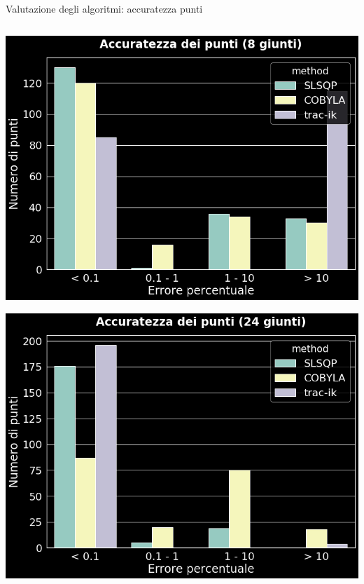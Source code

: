 \begin{frame}{Valutazione degli algoritmi: accuratezza punti}
\begin{columns}
\begin{column}{0.35\textwidth}
\includegraphics[width=\textwidth]{slide/img_cinematica_inversa/accuratezza_8.png} 

\includegraphics[width=\textwidth]{slide/img_cinematica_inversa/accuratezza_24.png}


\end{column}
\end{columns}
\end{frame}
